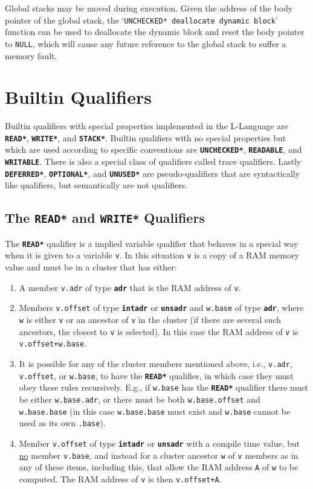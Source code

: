 \documentclass[12pt]{article}
\makeatletter
\newcommand{\TT}[1]{{\tt \bfseries #1}}
\newcommand{\ttakey}[1]{\TT{*#1*}\index{#1@{\tt *#1*}}}
\newcommand{\EOL}{\penalty \exhyphenpenalty}
\makeatother
\begin{document}
Global stacks may be moved during execution.  Given the address of
the body pointer of the global stack, the `{\tt *UNCHECKED* deallocate
dynamic block}' function can be used to deallocate the dynamic block and
reset the body pointer to {\tt NULL}, which will cause any future
reference to the global stack to suffer a memory fault.

\section{Builtin Qualifiers}
\label{BUILTIN-QUALIFIERS}

Builtin qualifiers with special properties implemented in the L-Language
are \TT{*READ*}, \TT{*WRITE*}, and \TT{*STACK*}.
Builtin qualifiers with no special properties but which are used
according to specific conventions are \TT{*UNCHECKED*}, \TT{*READABLE},
and \TT{*WRITABLE}.
There is also a special class of qualifiers called trace qualifiers.
Lastly \TT{*DEFERRED*}, \TT{*OPTIONAL*}, and \TT{*UNUSED*}
are pseudo-qualifiers that are
syntactically like qualifiers, but semantically are not qualifiers.

\subsection{The \TT{*READ*} and \TT{*WRITE*} Qualifiers}
\label{THE-READ-AND-WRITE-QUALIFIERS}

The \ttakey{READ} qualifier is a implied variable qualifier that behaves
in a special way when it is given to a variable {\tt v}.
In this situation {\tt v} is a copy of a RAM memory value and
must be in a cluster that
has either:
\begin{enumerate}
\item
A member {\tt v.adr} of type \TT{adr} 
that is the RAM address of {\tt v}.

\item
Members {\tt v.offset} of type \TT{intadr} or \TT{unsadr} and
{\tt w.base} of type \TT{adr}, where
{\tt w} is either {\tt v} or an ancestor
of {\tt v} in the cluster (if there are several such ancestors, the
closest to {\tt v} is selected).
In this case the RAM address of {\tt v} is {\tt v.offset+w.base}.

\item
It is possible for any of the cluster members mentioned above,
i.e., {\tt v.adr}, {\tt v.offset}, or {\tt w.base}, to have the
\TT{*READ*} qualifier, in which case they must obey these rules recursively.
E.g., if {\tt w.base} has the \TT{*READ*} qualifier there must be either
{\tt w.base.adr}, or there must be both
{\tt w.base\EOL .offset} and {\tt w.base.base} (in this case
{\tt w.base.base} must exist and {\tt w.base} cannot be used as its
own {\tt .base}).

\item
Member {\tt v.offset} of type \TT{intadr} or \TT{unsadr} with a
compile time value, but \underline{no} member {\tt v.base},
and instead for a cluster ancestor {\tt w} of {\tt v}
members as in any of these items, including this, that allow the RAM
address {\tt A} of {\tt w} to be computed.  The RAM address of {\tt v}
is then {\tt v.offset+A}.
\end{enumerate}
\end{document}
